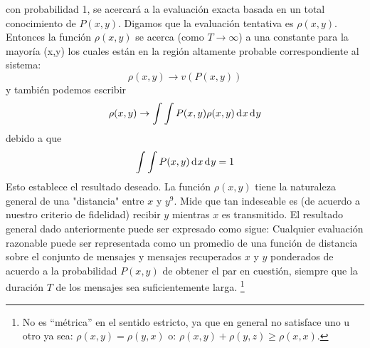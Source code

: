 con probabilidad 1, se acercar\'a a la evaluaci\'on exacta basada en
un total conocimiento de $P(x, y)$.  Digamos que la evaluaci\'on
tentativa es $\rho(x, y)$. Entonces la funci\'on $\rho(x, y)$ se
acerca (como $T \rightarrow \infty$) a una constante para la mayor\'ia
(x,y) los cuales est\'an en la regi\'on altamente probable
correspondiente al sistema:
\begin{equation} \rho(x, y) \rightarrow v(P(x, y)) \end{equation}
y tambi\'en podemos escribir
\begin{equation} \rho(x, y) \rightarrow \int \int P(x,y)\rho(x, y)  \diff x   \diff y  \end{equation}
debido a que
\begin{equation} \int \int P(x, y)  \diff x   \diff y  = 1 \end{equation}
Esto establece el resultado deseado.  La funci\'on $\rho(x, y)$ tiene
la naturaleza general de una "distancia" entre $x$ y $y^{9}$.  Mide
que tan indeseable es (de acuerdo a nuestro criterio de fidelidad)
recibir $y$ mientras $x$ es transmitido. El resultado general dado
anteriormente puede ser expresado como sigue: Cualquier evaluaci\'on
razonable puede ser representada como un promedio de una funci\'on de
distancia sobre el conjunto de mensajes y mensajes recuperados $x$ y
$y$ ponderados de acuerdo a la probabilidad $P(x, y)$ de obtener el
par en cuesti\'on, siempre que la duraci\'on $T$ de los mensajes sea
suficientemente larga. \footnote{No es ``m\'etrica'' en el sentido
  estricto, ya que en general no satisface uno u otro ya sea:
  $\rho(x,y) = \rho(y,x)$ o: $\rho(x,y) + \rho(y,z) \geq \rho(x,x)$.}

